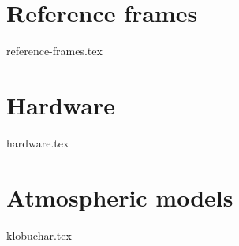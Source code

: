 
\graphicspath{{Appendices/}}
\begin{appendices}
\chapter{Reference frames}
    {reference-frames.tex}

\chapter{Hardware}
    {hardware.tex}
    
\chapter{Atmospheric models}
    {klobuchar.tex}
\end{appendices}